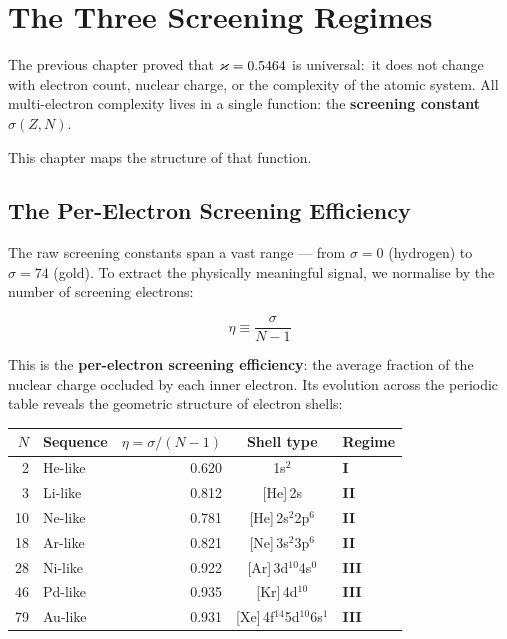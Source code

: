 
\chapter{The Three Screening Regimes}
\label{ch:screening-regimes}

The previous chapter proved that $\varkappa = 0.5464$ is universal:\ it does not change with electron count, nuclear charge, or the complexity of the atomic system.  All multi-electron complexity lives in a single function: the \textbf{screening constant} $\sigma(Z, N)$.

This chapter maps the structure of that function.


\section{The Per-Electron Screening Efficiency}
\label{sec:per-electron}

The raw screening constants span a vast range --- from $\sigma = 0$ (hydrogen) to $\sigma = 74$ (gold).  To extract the physically meaningful signal, we normalise by the number of screening electrons:

\begin{equation}\label{eq:efficiency}
  \eta \equiv \frac{\sigma}{N - 1}
\end{equation}

This is the \textbf{per-electron screening efficiency}: the average fraction of the nuclear charge occluded by each inner electron.  Its evolution across the periodic table reveals the geometric structure of electron shells:

\begin{center}
\begin{tabular}{rlrcl}
\toprule
$N$ & \textbf{Sequence} & $\eta = \sigma/(N{-}1)$ & \textbf{Shell type} & \textbf{Regime} \\
\midrule
  2 & He-like  & 0.620 & 1s$^2$           & \textbf{I} \\
  3 & Li-like  & 0.812 & [He]\,2s          & \textbf{II} \\
 10 & Ne-like  & 0.781 & [He]\,2s$^2$2p$^6$ & \textbf{II} \\
 18 & Ar-like  & 0.821 & [Ne]\,3s$^2$3p$^6$ & \textbf{II} \\
 28 & Ni-like  & 0.922 & [Ar]\,3d$^{10}$4s$^0$ & \textbf{III} \\
 46 & Pd-like  & 0.935 & [Kr]\,4d$^{10}$    & \textbf{III} \\
 79 & Au-like  & 0.931 & [Xe]\,4f$^{14}$5d$^{10}$6s$^1$ & \textbf{III} \\
\bottomrule
\end{tabular}
\end{center}

